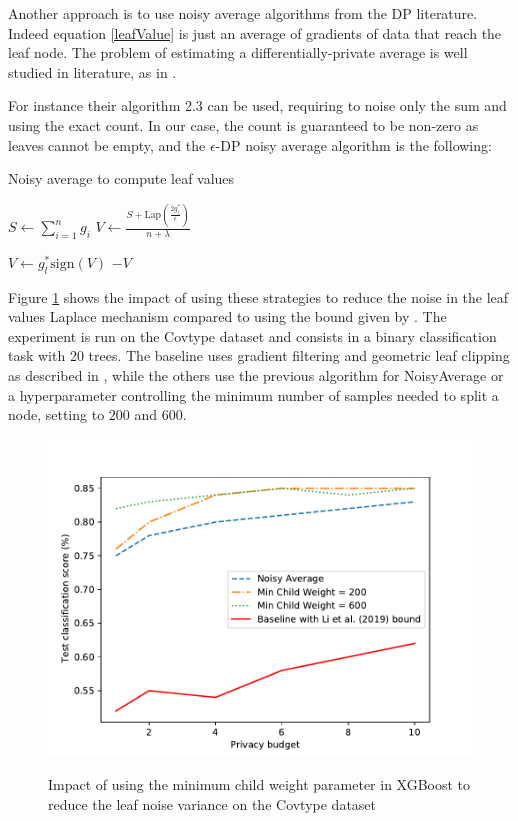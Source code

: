 \documentclass{article}
\theoremstyle{definition}
\begin{document}
Another approach is to use noisy average algorithms from the DP literature. Indeed equation \ref{leafValue} is just an average of gradients  of data that reach the leaf node. The problem of estimating a differentially-private average is well studied in literature, as in \cite{li2016dp}. 

For instance their algorithm 2.3 can be used, requiring to noise only the sum and using the exact count. In our case, the count is guaranteed to be non-zero as leaves cannot be empty, and the $\epsilon$-DP noisy average algorithm is the following:
\begin{algorithm}
\caption{Noisy average to compute leaf values}
$S \gets \sum_{i=1}^{n} g_i$ \; 
$V \gets \frac{ S + \text{Lap}( \frac{2g_l^*}{\epsilon} )}{n + \lambda} $ \; 

{
    $V \gets g_l^* \text{sign}(V)$ \;
}
\Return $-V$
\end{algorithm}

Figure \ref{leafNoisePlot} shows the impact of using these strategies to reduce the noise in the leaf values Laplace mechanism 
compared to using the bound given by \cite{li2020privacy}. The experiment is run on the Covtype dataset and consists in a binary
classification task with 20 trees. The baseline uses gradient filtering and geometric leaf clipping as described in \cite{li2020privacy}, while the others use the previous algorithm for NoisyAverage or a hyperparameter controlling the 
minimum number of samples needed to split a node, setting to $200$ and $600$.

\begin{figure}[h]
\centering 
\includegraphics[scale=0.7]{figs/plot_leafnoise.pdf}
\label{leafNoisePlot}
\caption{Impact of using the minimum child weight parameter in XGBoost to reduce the leaf noise variance on the Covtype dataset} 
\end{figure}
\end{document}
